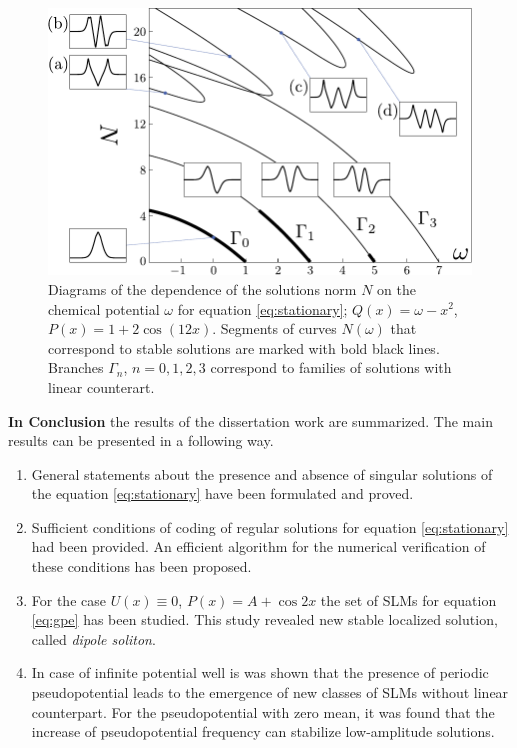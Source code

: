 \documentclass[candidate, href, colorlinks]{disser}
\begin{document}
\begin{figure}[h]
\centering
	\includegraphics[scale = 1]{pic/branches}
	\caption{
		Diagrams of the dependence of the solutions norm $N$ on the chemical potential $\omega$ for equation \eqref{eq:stationary}; $Q(x) = \omega - x^2$, $P(x) = 1 + 2 \cos (12 x)$.
		Segments of curves $N(\omega)$ that correspond to stable solutions are marked with bold black lines.
		Branches $\Gamma_n$, $n = 0, 1, 2, 3$ correspond to families of solutions with linear counterart.
	}
\label{fig:branches}
\end{figure}


\textbf{In Conclusion} the results of the dissertation work are summarized.
The main results can be presented in a following way. 
\begin{enumerate}
	\item General statements about the presence and absence of singular solutions of the equation \eqref{eq:stationary} have been formulated and proved.
	\item Sufficient conditions of coding of regular solutions for equation \eqref{eq:stationary} had been provided.
	An efficient algorithm for the numerical verification of these conditions has been proposed.
	\item For the case $U(x) \equiv 0$, $P(x) = A + \cos 2x$ the set of SLMs for equation \eqref{eq:gpe} has been studied.
	This study revealed new stable localized solution, called {\it dipole soliton}.
	\item In case of infinite potential well is was shown that the presence of periodic pseudopotential leads to the emergence of new classes of SLMs without linear counterpart.
		For the pseudopotential with zero mean, it was found that the increase of pseudopotential frequency can stabilize low-amplitude solutions.
\end{enumerate}
\end{document}
